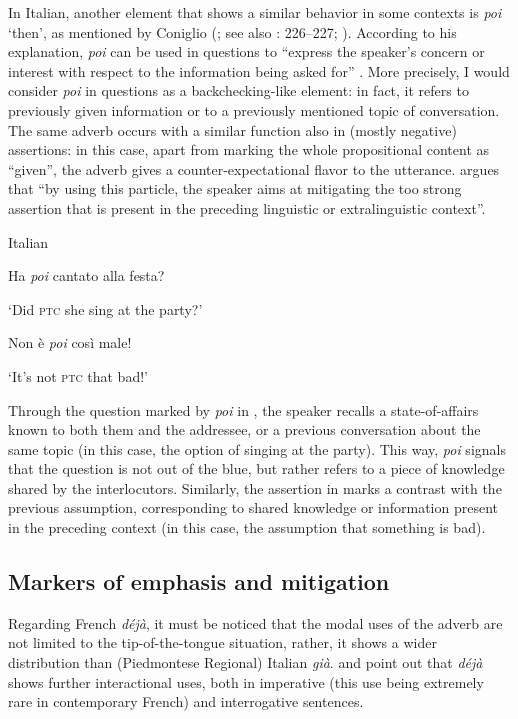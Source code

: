 In Italian, another element that shows a similar behavior in some contexts is \textit{poi} ‘then’, as mentioned by Coniglio (\citeyear[111--114]{Coniglio2008}; see also \citealt{Bazzanella1995}: 226–227; \citealt{CruschinaCognola2021}). According to his explanation, \textit{poi} can be used in questions to “express the speaker’s concern or interest with respect to the information being asked for” \citep[111]{Coniglio2008}. More precisely, I would consider \textit{poi} in questions as a backchecking-like element: in fact, it refers to previously given information or to a previously mentioned topic of conversation. The same adverb occurs with a similar function also in (mostly negative) assertions: in this case, apart from marking the whole propositional content as “given”, the adverb gives a counter-expectational flavor to the utterance. \citet[112]{Coniglio2008} argues that “by using this particle, the speaker aims at mitigating the too strong assertion that is present in the preceding linguistic or extralinguistic context”.

\ea%
    \label{ex:key:99}

          Italian \citep[112]{Coniglio2008}

  \ea\label{ex:key:99a} Ha \textit{poi} cantato alla festa?

\glt ‘Did \textsc{ptc} she sing at the party?’

   \ex \label{ex:key:99b} Non è \textit{poi} così male!

\glt ‘It’s not \textsc{ptc} that bad!’
    \z %
    \z

Through the question marked by \textit{poi} in , the speaker recalls a state-of-affairs known to both them and the addressee, or a previous conversation about the same topic (in this case, the option of singing at the party). This way, \textit{poi} signals that the question is not out of the blue, but rather refers to a piece of knowledge shared by the interlocutors. Similarly, the assertion in  marks a contrast with the previous assumption, corresponding to shared knowledge or information present in the preceding context (in this case, the assumption that something is bad).

\subsection{Markers of emphasis and mitigation}
\hypertarget{Toc124860683}{}
Regarding French \textit{déjà}, it must be noticed that the modal uses of the adverb are not limited to the tip-of-the-tongue situation, rather, it shows a wider distribution than (Piedmontese Regional) Italian \textit{già}. \citet[497–498]{HansenStrudsholm2008} and \citet[213–216]{Hansen2008} point out that \textit{déjà} shows further interactional uses, both in imperative (this use being extremely rare in contemporary French) and interrogative sentences.

